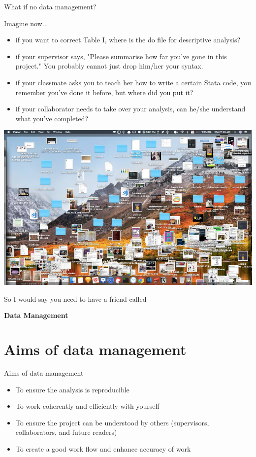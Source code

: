 \documentclass{beamer}
\begin{document}
\begin{frame}[allowframebreaks]{What if no data management?}
\newpage

Imagine now...
\begin{itemize}
	\item if you want to correct Table I, where is the do file for descriptive analysis?
	\item if your supervisor says, "Please summarise how far you've gone in this project." You probably cannot just drop him/her your syntax. 
	\item if your classmate asks you to teach her how to write a certain Stata code, you remember you've done it before, but where did you put it?
	\item if your collaborator needs to take over your analysis, can he/she understand what you've completed?
\end{itemize}

\newpage 

\begin{center}
		\includegraphics[scale=0.3]{image/more-messy-desktop}
\end{center}

\newpage

So I would say you need to have a friend called \\
\begin{center}
	{\huge \textbf{Data Management}}
\end{center}

\end{frame}

\section{Aims of data management}
\begin{frame}{Aims of data management}
\begin{itemize}
	\item To ensure the analysis is reproducible
	\item To work coherently and efficiently with yourself 
	\item To ensure the project can be understood by others (supervisors, collaborators, and future readers)
	\item To create a good work flow and enhance accuracy of work 	
\end{itemize}
\end{frame}
\end{document}
